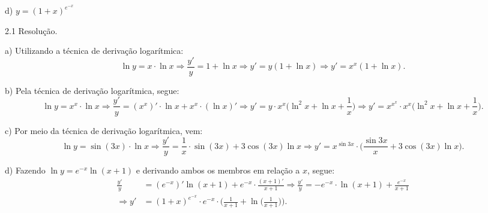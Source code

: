 \documentclass{article}
\begin{document}
{\begin{newpage}
\begin{multicols}{4}
d) $y=(1+x)^{e^{-x}}$
\end{multicols}
\par
\vspace{0.3cm}
\begin{flushleft}
2.1 Resolução.
\end{flushleft}
\par
a) Utilizando a técnica de derivação logarítmica:
\begin{equation*}\displaystyle{ \ln{y} =  x\cdot\ln{x} \Rightarrow \frac{y'}{y} = 1 + \ln{x} \Rightarrow y'=y(1 + \ln{x}) \Rightarrow y'=x^{x}(1 + \ln{x})} .\end{equation*}
\par
\vspace{0.3cm}
b) Pela técnica de derivação logarítmica, segue:
\begin{equation*} \displaystyle{\ln{y} = x^{x}\cdot\ln{x} \Rightarrow \frac{y'}{y}= (x^x)'\cdot\ln{x} + x^{x}\cdot (\ln{x})' \Rightarrow y' = y\cdot x^{x}\Big(\ln^{2}{x} + \ln{x} + \frac{1}{x}\Big) \Rightarrow y'= x^{x^x}\cdot x^{x}\Big(\ln^{2}{x} + \ln{x} + \frac{1}{x}\Big)} .\end{equation*}
\par
\vspace{0.3cm}
c) Por meio da técnica de derivação logarítmica, vem:
\begin{equation*} \ln{y} = \sin{(3x)}\cdot\ln{x} \Rightarrow \displaystyle{\frac{y'}{y} = \frac{1}{x}\cdot\sin{(3x)} + 3\cos{(3x)}\ln{x} \Rightarrow y'=x^{\sin{3x}}\cdot \Big(\frac{\sin{3x}}{x} + 3\cos{(3x)}\ln{x}\Big)} .\end{equation*}
\par
\vspace{0.3cm}
d) Fazendo $\ln{y} = e^{-x}\ln{(x+1)}$ e derivando ambos os membros em relação a $x$, segue:
\begin{equation*}  \displaystyle{\begin{split}
\frac{y'}{y}&= (e^{-x})'\ln{(x+1)} + e^{-x}\cdot\frac{(x+1)'}{x+1} \Rightarrow \frac{y'}{y}=-e^{-x}\cdot\ln{(x+1)} + \frac{e^{-x}}{x+1} \\
\Rightarrow y'&=(1+x)^{e^{-x}}\cdot e^{-x}\cdot \Big(\frac{1}{x+1} + \ln{\Big(\frac{1}{x+1}\Big)}\Big). \end{split}} \end{equation*}
\par
\vspace{0.3cm}

\end{newpage}}
\end{document}
